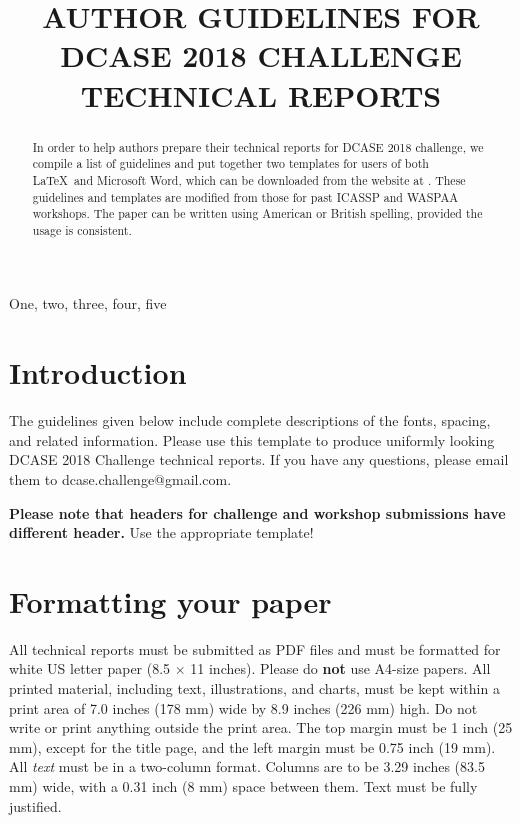 \documentclass{article}
\title{AUTHOR GUIDELINES FOR DCASE 2018 CHALLENGE TECHNICAL REPORTS}
\begin{document}
\ninept
\maketitle

\begin{sloppy}

\begin{abstract}
In order to help authors prepare their technical reports for DCASE 2018 challenge, we compile a list of guidelines and put together two templates for users of both \LaTeX\ and Microsoft Word, which can be downloaded from the website at \cite{dcase2018web}. These guidelines and templates are modified from those for past ICASSP and WASPAA workshops. The paper can be written using American or British spelling, provided the usage is consistent.
\end{abstract}

\begin{keywords}
One, two, three, four, five
\end{keywords}


\section{Introduction}
\label{sec:intro}

The guidelines given below include complete descriptions of the fonts, spacing, and related information. Please use this template to produce uniformly looking DCASE 2018 Challenge technical reports.
If you have any questions, please email them to dcase.challenge@gmail.com.

\textbf{Please note that headers for challenge and workshop submissions have different header.} Use the appropriate template!




\section{Formatting your paper}
\label{sec:format}

All technical reports must be submitted as PDF files and must be formatted for white US letter paper (8.5 $\times$ 11 inches). Please do {\bf not} use A4-size papers. All printed material, including text, illustrations, and charts, must be kept within a print area of 7.0 inches (178 mm) wide by 8.9 inches (226 mm) high. Do not write or print anything outside the print area. The top margin must be 1 inch (25 mm), except for the title page, and the left margin must be 0.75 inch (19 mm).  All {\it text} must be in a two-column format. Columns are to be 3.29 inches (83.5 mm) wide, with a 0.31 inch (8 mm) space between them. Text must be fully justified. 


\end{sloppy}
\end{document}
